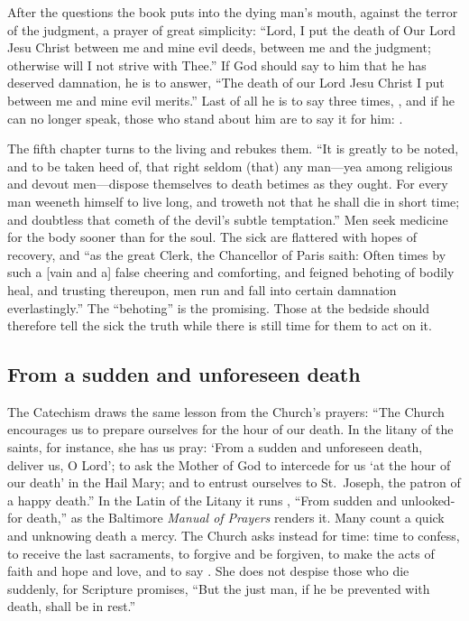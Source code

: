 \noindent After the questions the book puts into the dying man's mouth, against the terror of the judgment, a prayer of great simplicity: ``Lord, I put the death of Our Lord Jesu Christ between me and mine evil deeds, between me and the judgment; otherwise will I not strive with Thee.'' If God should say to him that he has deserved damnation, he is to answer, ``The death of our Lord Jesu Christ I put between me and mine evil merits.'' Last of all he is to say three times, , and if he can no longer speak, those who stand about him are to say it for him: .

The fifth chapter turns to the living and rebukes them. ``It is greatly to be noted, and to be taken heed of, that right seldom (that) any man---yea among religious and devout men---dispose themselves to death betimes as they ought. For every man weeneth himself to live long, and troweth not that he shall die in short time; and doubtless that cometh of the devil's subtle temptation.'' Men seek medicine for the body sooner than for the soul. The sick are flattered with hopes of recovery, and ``as the great Clerk, the Chancellor of Paris saith: Often times by such a [vain and a] false cheering and comforting, and feigned behoting of bodily heal, and trusting thereupon, men run and fall into certain damnation everlastingly.'' The ``behoting'' is the promising. Those at the bedside should therefore tell the sick the truth while there is still time for them to act on it.

\subsection{From a sudden and unforeseen death}

The Catechism draws the same lesson from the Church's prayers: ``The Church encourages us to prepare ourselves for the hour of our death. In the litany of the saints, for instance, she has us pray: `From a sudden and unforeseen death, deliver us, O Lord'; to ask the Mother of God to intercede for us `at the hour of our death' in the Hail Mary; and to entrust ourselves to St.~Joseph, the patron of a happy death.'' In the Latin of the Litany it runs , ``From sudden and unlooked-for death,'' as the Baltimore \emph{Manual of Prayers} renders it. Many count a quick and unknowing death a mercy. The Church asks instead for time: time to confess, to receive the last sacraments, to forgive and be forgiven, to make the acts of faith and hope and love, and to say . She does not despise those who die suddenly, for Scripture promises, ``But the just man, if he be prevented with death, shall be in rest.''

